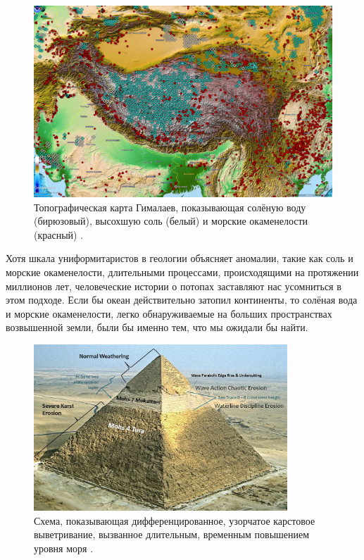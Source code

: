 \documentclass[10pt,twocolumn,letterpaper]{article}
\begin{document}
\begin{figure}[t]
\begin{center}
   \includegraphics[width=1\linewidth]{tibet.jpg}
\end{center}
   \caption{Топографическая карта Гималаев, показывающая солёную воду (бирюзовый), высохшую соль (белый) и морские окаменелости (красный) \cite{15,16,86,87}.}
\label{fig:3}
\label{fig:onecol}
\end{figure}

Хотя шкала униформитаристов в геологии объясняет аномалии, такие как соль и морские окаменелости, длительными процессами, происходящими на протяжении миллионов лет, человеческие истории о потопах заставляют нас усомниться в этом подходе. Если бы океан действительно затопил континенты, то солёная вода и морские окаменелости, легко обнаруживаемые на больших пространствах возвышенной земли, были бы именно тем, что мы ожидали бы найти.

\begin{figure}[t]
\begin{center}
\includegraphics[width=0.85\textwidth]{khafre.jpg}
\end{center}
   \caption{Схема, показывающая дифференцированное, узорчатое карстовое выветривание, вызванное длительным, временным повышением уровня моря \cite{27}.}
\label{fig:4}
\end{figure}
\end{document}
